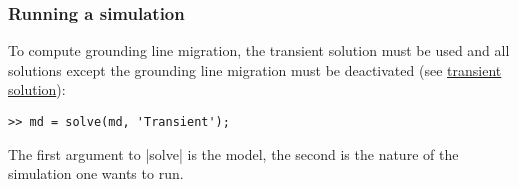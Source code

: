 \subsubsection{Running a simulation}
To compute grounding line migration, the transient solution must be used and all solutions except the grounding line migration must be deactivated (see 
\hyperref[sec:using-issm-capabilities-transient]{transient solution}):
\begin{lstlisting}
>> md = solve(md, 'Transient');
\end{lstlisting}
The first argument to \lstinlinebg|solve| is the model, the second is the nature of the simulation one wants to run.

\clearpage %
